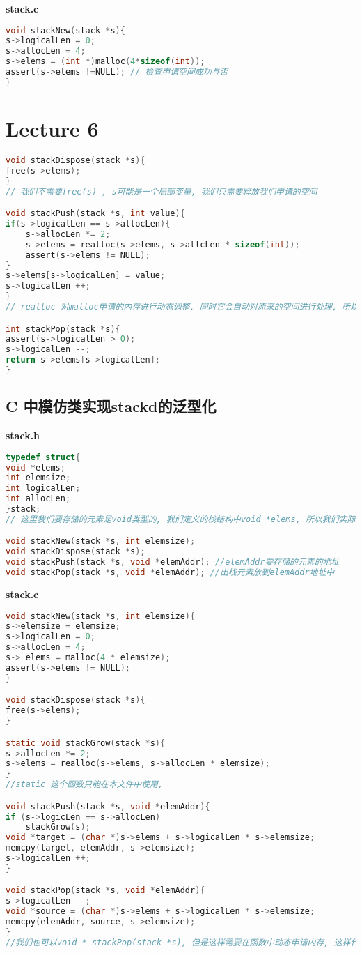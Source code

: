 \documentclass{article}
\begin{document}
\textbf{stack.c}
\begin{lstlisting}[language = C]
void stackNew(stack *s){
s->logicalLen = 0;
s->allocLen = 4;
s->elems = (int *)malloc(4*sizeof(int));
assert(s->elems !=NULL); // 检查申请空间成功与否
}
\end{lstlisting}

\section{Lecture 6}
\begin{lstlisting}[language = C]
void stackDispose(stack *s){
free(s->elems);
}
// 我们不需要free(s) , s可能是一个局部变量, 我们只需要释放我们申请的空间

void stackPush(stack *s, int value){
if(s->logicalLen == s->allocLen){
	s->allocLen *= 2;
	s->elems = realloc(s->elems, s->allcLen * sizeof(int));
	assert(s->elems != NULL);
}
s->elems[s->logicalLen] = value;
s->logicalLen ++;
}
// realloc 对malloc申请的内存进行动态调整, 同时它会自动对原来的空间进行处理, 所以不需要我们手动处理

int stackPop(stack *s){
assert(s->logicalLen > 0);
s->logicalLen --;
return s->elems[s->logicalLen];
}
\end{lstlisting}

\subsection{C 中模仿类实现stackd的泛型化}
\textbf{stack.h}
\begin{lstlisting}[language = C]
typedef struct{
void *elems;
int elemsize;
int logicalLen;
int allocLen;
}stack;
// 这里我们要存储的元素是void类型的, 我们定义的栈结构中void *elems, 所以我们实际上在栈中存储的是我们想要存储东西的指针, 在这里, 也就是说栈中的元素是void *类型的

void stackNew(stack *s, int elemsize);
void stackDispose(stack *s);
void stackPush(stack *s, void *elemAddr); //elemAddr要存储的元素的地址
void stackPop(stack *s, void *elemAddr); //出栈元素放到elemAddr地址中
\end{lstlisting}

\textbf{stack.c}
\begin{lstlisting}[language = C]
void stackNew(stack *s, int elemsize){
s->elemsize = elemsize;
s->logicalLen = 0;
s->allocLen = 4;
s-> elems = malloc(4 * elemsize);
assert(s->elems != NULL);
}

void stackDispose(stack *s){
free(s->elems);
}

static void stackGrow(stack *s){
s->allocLen *= 2;
s->elems = realloc(s->elems, s->allocLen * elemsize);
}
//static 这个函数只能在本文件中使用,

void stackPush(stack *s, void *elemAddr){
if (s->logicLen == s->allocLen)
	stackGrow(s);
void *target = (char *)s->elems + s->logicalLen * s->elemsize;
memcpy(target, elemAddr, s->elemsize);
s->logicalLen ++;
}

void stackPop(stack *s, void *elemAddr){
s->logicalLen --;
void *source = (char *)s->elems + s->logicalLen * s->elemsize;
memcpy(elemAddr, source, s->elemsize);
}
//我们也可以void * stackPop(stack *s), 但是这样需要在函数中动态申请内存, 这样代码会变得很难维护, 所以不推荐那样做
\end{lstlisting}
\end{document}
